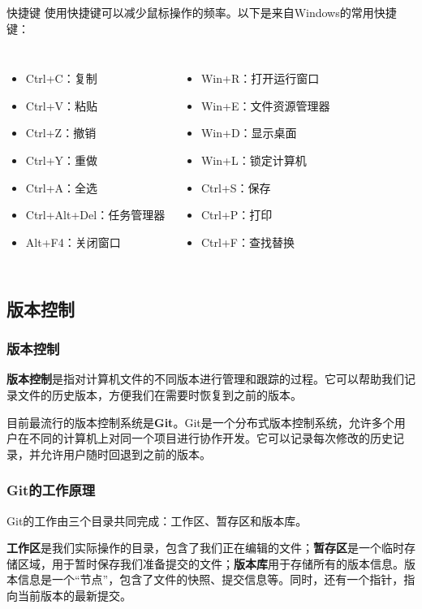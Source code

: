 \documentclass{beamer}
\begin{document}
\begin{frame}{快捷键}
    使用快捷键可以减少鼠标操作的频率。以下是来自Windows的常用快捷键：
    \begin{columns}[T]
            \begin{itemize}
                \item Ctrl+C：复制
                \item Ctrl+V：粘贴
                \item Ctrl+Z：撤销
                \item Ctrl+Y：重做
                \item Ctrl+A：全选
                \item Ctrl+Alt+Del：任务管理器
                \item Alt+F4：关闭窗口
            \end{itemize}

            \begin{itemize}
                \item Win+R：打开运行窗口
                \item Win+E：文件资源管理器
                \item Win+D：显示桌面
                \item Win+L：锁定计算机
                \item Ctrl+S：保存
                \item Ctrl+P：打印
                \item Ctrl+F：查找替换
            \end{itemize}
    \end{columns}
\end{frame}
\subsection{版本控制}
\begin{frame}
    \frametitle{版本控制}
    \textbf{版本控制}是指对计算机文件的不同版本进行管理和跟踪的过程。它可以帮助我们记录文件的历史版本，方便我们在需要时恢复到之前的版本。

    目前最流行的版本控制系统是\textbf{Git}。Git是一个分布式版本控制系统，允许多个用户在不同的计算机上对同一个项目进行协作开发。它可以记录每次修改的历史记录，并允许用户随时回退到之前的版本。
\end{frame}

\begin{frame}
    \frametitle{Git的工作原理}
    Git的工作由三个目录共同完成：工作区、暂存区和版本库。

    \textbf{工作区}是我们实际操作的目录，包含了我们正在编辑的文件；\textbf{暂存区}是一个临时存储区域，用于暂时保存我们准备提交的文件；\textbf{版本库}用于存储所有的版本信息。版本信息是一个“节点”，包含了文件的快照、提交信息等。同时，还有一个指针，指向当前版本的最新提交。
\end{frame}
\end{document}
